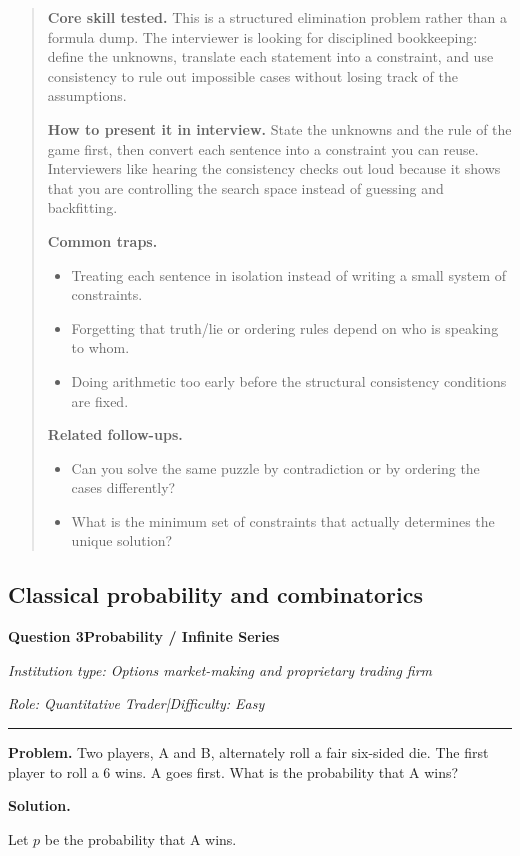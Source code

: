 \documentclass[11pt,letterpaper,openany]{book}
\newenvironment{EditorialNote}
  {\begin{quote}\small\setlength{\parskip}{0.25em}}
  {\end{quote}}
\newcommand{\QuestionSpacer}{\vspace{0.4em}}
\newcommand{\InterviewQuestionHeader}[5]{%
  \vspace{1.0em}%
  {\large\bfseries #1\enspace #4\par}%
  {\small\itshape Institution type: #2\par}%
  {\small\itshape Role: #3\enspace |\enspace Difficulty: #5\par}%
  \vspace{0.25em}\hrule\vspace{0.45em}%
}
\begin{document}
\begin{EditorialNote}


\textbf{Core skill tested.} This is a structured elimination problem rather than a formula dump. The interviewer is looking for disciplined bookkeeping: define the unknowns, translate each statement into a constraint, and use consistency to rule out impossible cases without losing track of the assumptions.

\textbf{How to present it in interview.} State the unknowns and the rule of the game first, then convert each sentence into a constraint you can reuse. Interviewers like hearing the consistency checks out loud because it shows that you are controlling the search space instead of guessing and backfitting.

\textbf{Common traps.}
\begin{itemize}
\item Treating each sentence in isolation instead of writing a small system of constraints.
\item Forgetting that truth/lie or ordering rules depend on who is speaking to whom.
\item Doing arithmetic too early before the structural consistency conditions are fixed.
\end{itemize}

\textbf{Related follow-ups.}
\begin{itemize}
\item Can you solve the same puzzle by contradiction or by ordering the cases differently?
\item What is the minimum set of constraints that actually determines the unique solution?
\end{itemize}


\end{EditorialNote}
\QuestionSpacer

\subsection{Classical probability and combinatorics}

\InterviewQuestionHeader{Question 3}{Options market-making and proprietary trading firm}{Quantitative Trader}{Probability / Infinite Series}{Easy}
\textbf{Problem.} Two players, A and B, alternately roll a fair six-sided die. The first player to roll a 6 wins. A goes first. What is the probability that A wins?

\textbf{Solution.}

Let \(p\) be the probability that A wins.
\end{document}
